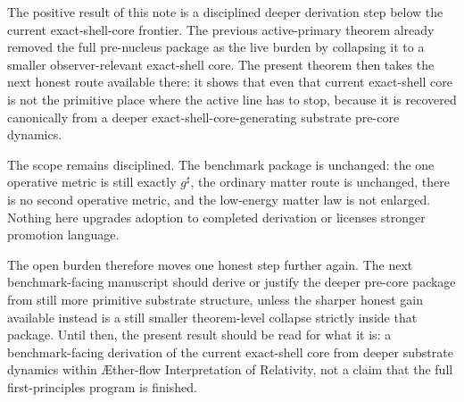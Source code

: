 \documentclass[11pt]{article}
\newcommand{\Aflow}{\AE{}ther-flow}
\newcommand{\TheoryName}{\Aflow{} Interpretation of Relativity}
\newcommand{\CompletedMetric}{g^{\sharp}}
\begin{document}
The positive result of this note is a disciplined deeper derivation step below the current exact-shell-core frontier. The previous active-primary theorem already removed the full pre-nucleus package as the live burden by collapsing it to a smaller observer-relevant exact-shell core. The present theorem then takes the next honest route available there: it shows that even that current exact-shell core is not the primitive place where the active line has to stop, because it is recovered canonically from a deeper exact-shell-core-generating substrate pre-core dynamics.

The scope remains disciplined. The benchmark package is unchanged: the one operative metric is still exactly \(\CompletedMetric\), the ordinary matter route is unchanged, there is no second operative metric, and the low-energy matter law is not enlarged. Nothing here upgrades adoption to completed derivation or licenses stronger promotion language.

The open burden therefore moves one honest step further again. The next benchmark-facing manuscript should derive or justify the deeper pre-core package from still more primitive substrate structure, unless the sharper honest gain available instead is a still smaller theorem-level collapse strictly inside that package. Until then, the present result should be read for what it is: a benchmark-facing derivation of the current exact-shell core from deeper substrate dynamics within \TheoryName{}, not a claim that the full first-principles program is finished.
\end{document}
